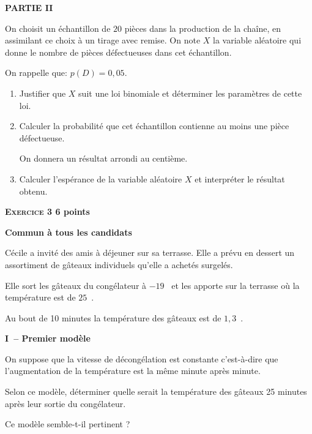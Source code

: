 \documentclass[11pt,a4paper,french]{article}
\begin{document}
\textbf{PARTIE II}

\medskip

On choisit un échantillon de $20$ pièces dans la production de la chaîne, en assimilant
ce choix à un tirage avec remise. On note $X $ la variable aléatoire qui donne le nombre
de pièces défectueuses dans cet échantillon.

On rappelle que: $p(D) = 0,05$.

\medskip

\begin{enumerate}
\item  Justifier que $X$ suit une loi binomiale et déterminer les paramètres de cette loi.
\item Calculer la probabilité que cet échantillon contienne au moins une pièce défectueuse.

On donnera un résultat arrondi au centième.
\item Calculer l'espérance de la variable aléatoire $X$ et interpréter le résultat obtenu.

\end{enumerate}

\vspace{0,5cm}

\textbf{\textsc{Exercice 3} \hfill 6 points}

\textbf{Commun à tous les candidats}

\vspace{0.5cm}

Cécile a invité des amis à déjeuner sur sa terrasse. Elle a prévu en dessert 
un assortiment de gâteaux individuels qu'elle a achetés surgelés.

Elle sort les gâteaux du congélateur à $-19$~\textcelsius{} et les apporte sur la terrasse où la température est de  $25$~\textcelsius.

Au bout de 10 minutes la température des gâteaux est de $1,3$~\textcelsius.

\begin{center}
\textbf{I~-- Premier modèle}
\end{center}

On suppose que la vitesse de décongélation est constante c'est-à-dire que l'augmentation de la température est la même minute après minute.

Selon ce modèle, déterminer quelle serait la température des gâteaux 25 minutes après leur sortie du congélateur.

Ce modèle semble-t-il pertinent ? 

\medskip
\end{document}
